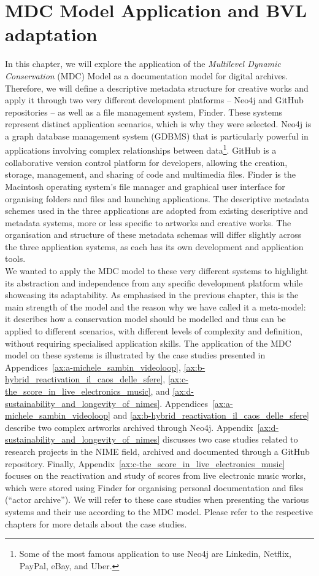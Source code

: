 \chapter{\label{ch:4-madc_model_application}MDC Model Application and BVL adaptation}

In this chapter, we will explore the application of the \textit{Multilevel Dynamic Conservation} (MDC) Model as a documentation model for digital archives. Therefore, we will define a descriptive metadata structure for creative works and apply it through two very different development platforms – Neo4j and GitHub repositories – as well as a file management system, Finder. These systems represent distinct application scenarios, which is why they were selected. Neo4j is a graph database management system (GDBMS) that is particularly powerful in applications involving complex relationships between data\footnote{Some of the most famous application to use Neo4j are Linkedin, Netflix, PayPal, eBay, and Uber.}. GitHub is a collaborative version control platform for developers, allowing the creation, storage, management, and sharing of code and multimedia files. Finder is the Macintosh operating system's file manager and graphical user interface for organising folders and files and launching applications. The descriptive metadata schemes used in the three applications are adopted from existing descriptive and metadata systems, more or less specific to artworks and creative works. The organisation and structure of these metadata schemas will differ slightly across the three application systems, as each has its own development and application tools.\\
We wanted to apply the MDC model to these very different systems to highlight its abstraction and independence from any specific development platform while showcasing its adaptability. As emphasised in the previous chapter, this is the main strength of the model and the reason why we have called it a meta-model: it describes how a conservation model should be modelled and thus can be applied to different scenarios, with different levels of complexity and definition, without requiring specialised application skills. The application of the MDC model on these systems is illustrated by the case studies presented in Appendices~\ref{ax:a-michele_sambin_videoloop}, \ref{ax:b-hybrid_reactivation_il_caos_delle_sfere}, \ref{ax:c-the_score_in_live_electronics_music}, and \ref{ax:d-sustainability_and_longevity_of_nimes}. Appendices~\ref{ax:a-michele_sambin_videoloop} and \ref{ax:b-hybrid_reactivation_il_caos_delle_sfere} describe two complex artworks archived through Neo4j. Appendix~\ref{ax:d-sustainability_and_longevity_of_nimes} discusses two case studies related to research projects in the NIME field, archived and documented through a GitHub repository. Finally, Appendix~\ref{ax:c-the_score_in_live_electronics_music} focuses on the reactivation and study of scores from live electronic music works, which were stored using Finder for organising personal documentation and files (``actor archive''). We will refer to these case studies when presenting the various systems and their use according to the MDC model. Please refer to the respective chapters for more details about the case studies.\\
